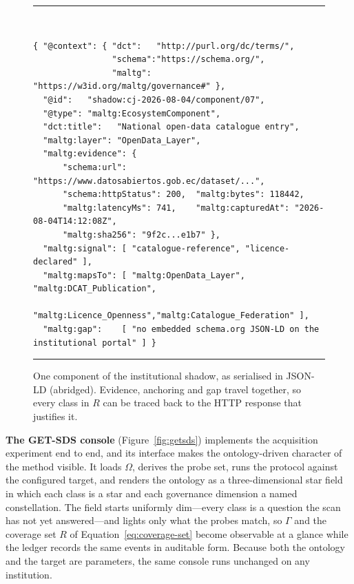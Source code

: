 \documentclass[engproc,proceedingpaper,submit,moreauthors]{Definitions/mdpi}
\begin{document}
\begin{figure}[H]
\centering
\begin{minipage}{\textwidth}
\footnotesize
\rule{\textwidth}{0.6pt}\\[-4pt]
\begin{verbatim}
{ "@context": { "dct":   "http://purl.org/dc/terms/",
                "schema":"https://schema.org/",
                "maltg": "https://w3id.org/maltg/governance#" },
  "@id":   "shadow:cj-2026-08-04/component/07",
  "@type": "maltg:EcosystemComponent",
  "dct:title":   "National open-data catalogue entry",
  "maltg:layer": "OpenData_Layer",
  "maltg:evidence": {
      "schema:url":  "https://www.datosabiertos.gob.ec/dataset/...",
      "schema:httpStatus": 200,  "maltg:bytes": 118442,
      "maltg:latencyMs": 741,    "maltg:capturedAt": "2026-08-04T14:12:08Z",
      "maltg:sha256": "9f2c...e1b7" },
  "maltg:signal": [ "catalogue-reference", "licence-declared" ],
  "maltg:mapsTo": [ "maltg:OpenData_Layer",  "maltg:DCAT_Publication",
                    "maltg:Licence_Openness","maltg:Catalogue_Federation" ],
  "maltg:gap":    [ "no embedded schema.org JSON-LD on the institutional portal" ] }
\end{verbatim}
\vspace{-8pt}\rule{\textwidth}{0.6pt}
\end{minipage}
\caption{One component of the institutional shadow, as serialised in JSON-LD (abridged). Evidence, anchoring and gap travel together, so every class in $R$ can be traced back to the HTTP response that justifies it.\label{fig:jsonld}}
\end{figure}

    \textbf{The GET-SDS console} (Figure~\ref{fig:getsds}) implements the acquisition experiment end to end, and its interface makes the ontology-driven character of the method visible. It loads $\Omega$, derives the probe set, runs the protocol against the configured target, and renders the ontology as a three-dimensional star field in which each class is a star and each governance dimension a named constellation. The field starts uniformly dim---every class is a question the scan has not yet answered---and lights only what the probes match, so $\Gamma$ and the coverage set $R$ of Equation~\eqref{eq:coverage-set} become observable at a glance while the ledger records the same events in auditable form. Because both the ontology and the target are parameters, the same console runs unchanged on any institution.
\end{document}
